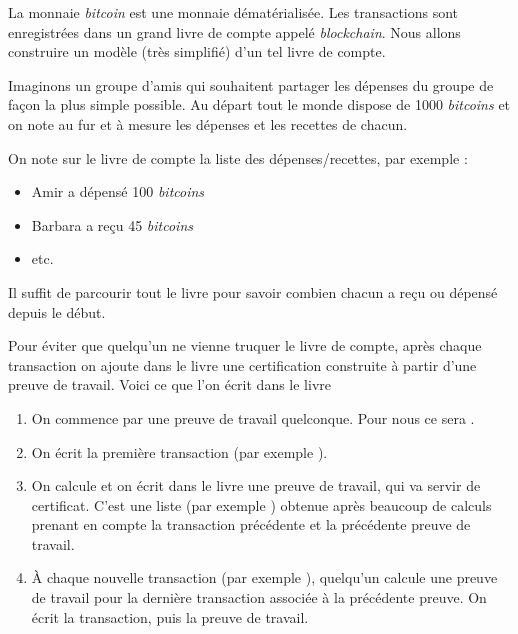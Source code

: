 \documentclass[11pt,class=report,crop=false]{standalone}
\begin{document}
\begin{cours}

La monnaie \emph{bitcoin} est une monnaie dématérialisée. Les transactions sont enregistrées dans un grand livre de compte appelé \emph{blockchain}. Nous allons construire un modèle (très simplifié) d'un tel livre de compte.


Imaginons un groupe d'amis qui souhaitent partager les dépenses du groupe de façon la plus simple possible. Au départ tout le monde dispose de 1000 \emph{bitcoins} et on note au fur et à mesure les dépenses et les recettes de chacun. 

On note sur le livre de compte la liste des dépenses/recettes, par exemple :
\begin{itemize}
  \item \og{}Amir a dépensé 100 \emph{bitcoins}\fg{}
  \item \og{}Barbara a reçu 45 \emph{bitcoins}\fg{}
  \item etc.
\end{itemize}
Il suffit de parcourir tout le livre pour savoir combien chacun a reçu ou dépensé depuis le début.

\bigskip

Pour éviter que quelqu'un ne vienne truquer le livre de compte, après chaque transaction on ajoute dans le livre une certification construite à partir d'une preuve de travail.
Voici ce que l'on écrit dans le livre
\begin{enumerate}
  \item On commence par une preuve de travail quelconque. Pour nous ce sera 
  \ci{[0,0,0,0,0,0]}.
  \item On écrit la première transaction (par exemple ).
  \item On calcule et on écrit dans le livre une preuve de travail, qui va servir de certificat. C'est une liste
  (par exemple \ci{[56,42,10,98,2,34]}) obtenue après beaucoup de calculs prenant en compte la transaction précédente et la précédente preuve de travail.
  \item À chaque nouvelle transaction (par exemple ), quelqu'un calcule une preuve de travail pour la dernière transaction associée à la précédente preuve. On écrit la transaction, puis la preuve de travail.
\end{enumerate}




\end{cours}
\end{document}
